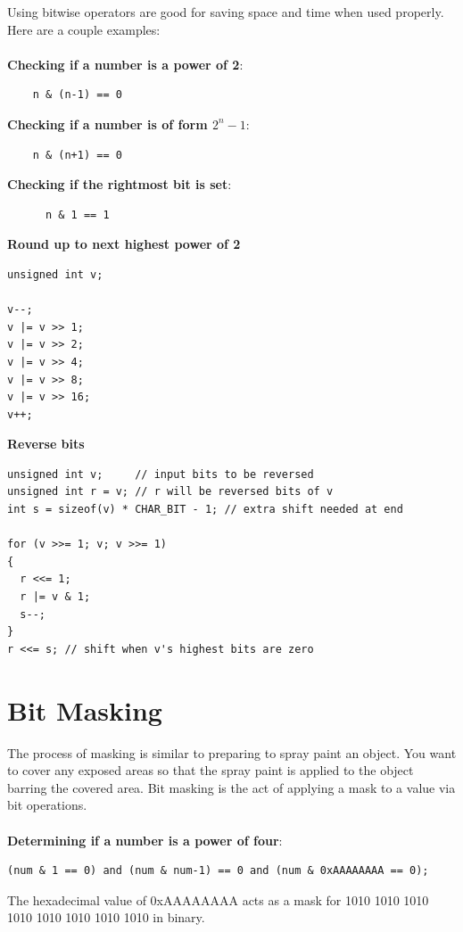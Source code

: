 \documentclass[]{book}
\begin{document}
    Using bitwise operators are good for saving space and time when used properly. Here are a couple
    examples:\\\\
    \textbf{Checking if a number is a power of 2}:
    \begin{verbatim}
    n & (n-1) == 0
    \end{verbatim}
    \textbf{Checking if a number is of form $2^n-1$}:
    \begin{verbatim}
    n & (n+1) == 0
    \end{verbatim}
    \textbf{Checking if the rightmost bit is set}:
    \begin{verbatim}
      n & 1 == 1
    \end{verbatim}
    \textbf{Round up to next highest power of 2}
    \begin{Verbatim}
unsigned int v;

v--;
v |= v >> 1;
v |= v >> 2;
v |= v >> 4;
v |= v >> 8;
v |= v >> 16;
v++;
    \end{Verbatim}
    \textbf{Reverse bits}
    \begin{Verbatim}
unsigned int v;     // input bits to be reversed
unsigned int r = v; // r will be reversed bits of v
int s = sizeof(v) * CHAR_BIT - 1; // extra shift needed at end

for (v >>= 1; v; v >>= 1)
{
  r <<= 1;
  r |= v & 1;
  s--;
}
r <<= s; // shift when v's highest bits are zero
    \end{Verbatim}
    \section{Bit Masking}
    The process of masking is similar to preparing to spray paint an object. You want to cover any exposed areas
    so that the spray paint is applied to the object barring the covered area. Bit masking is the act of applying
    a mask to a value via bit operations. \\\\
    \textbf{Determining if a number is a power of four}:
    \begin{verbatim}
(num & 1 == 0) and (num & num-1) == 0 and (num & 0xAAAAAAAA == 0);
    \end{verbatim}
    The hexadecimal value of 0xAAAAAAAA acts as a mask for 1010 1010 1010 1010 1010 1010 1010 1010 in binary.
\end{document}
